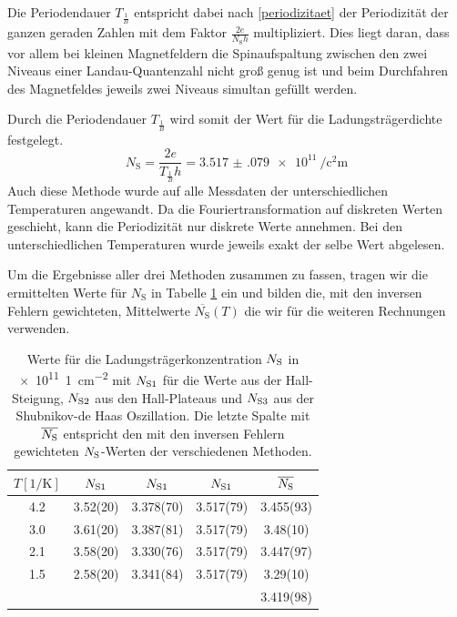 \documentclass[paper=a4,fontsize=10pt,DIV=18,twocolumn,parskip=half]{scrartcl}
\numberwithin{equation}{section}    %
\begin{document}
Die Periodendauer $T_{\frac{1}{B}}$ entspricht dabei nach \eqref{periodizitaet} der Periodizität der ganzen geraden Zahlen mit dem Faktor $\frac{2 e}{N_\mathrm{S} h}$ multipliziert. Dies liegt daran, dass vor allem bei kleinen Magnetfeldern die Spinaufspaltung zwischen den zwei Niveaus einer Landau-Quantenzahl nicht groß genug ist und beim Durchfahren des Magnetfeldes jeweils zwei Niveaus simultan gefüllt werden.

Durch die Periodendauer $T_{\frac{1}{B}}$ wird somit der Wert für die Ladungsträgerdichte festgelegt.
\begin{equation}
N_\mathrm{S}=\frac{2 e}{T_{\frac{1}{B}} h}=\SI{3.517(079)e11}{\per\square\centi\meter}
\label{ns_periode}
\end{equation}
Auch diese Methode wurde auf alle Messdaten der unterschiedlichen Temperaturen angewandt. Da die Fouriertransformation auf diskreten Werten geschieht, kann die Periodizität nur diskrete Werte annehmen. Bei den unterschiedlichen Temperaturen wurde jeweils exakt der selbe Wert abgelesen.

Um die Ergebnisse aller drei Methoden zusammen zu fassen, tragen wir die ermittelten Werte für $N_\mathrm{S}$ in Tabelle \ref{nswerte} ein und bilden die, mit den inversen Fehlern gewichteten, Mittelwerte $\overline{N_\mathrm{S}}(T)$ die wir für die weiteren Rechnungen verwenden.

\begin{table}[htp]
	\begin{center}
		\begin{tabular}{ccccc}
			\hline
			$T[1/\mathrm{K}]$ & $N_{\rm S1}$ & $N_{\rm S1}$ & $N_{\rm S1}$ & $\overline{N_{\rm S}}$\\
			\hline
			4.2 & 3.52(20) & 3.378(70) & 3.517(79) & 3.455(93)\\
			3.0 & 3.61(20) & 3.387(81) & 3.517(79) & 3.48(10)\\
			2.1 & 3.58(20) & 3.330(76) & 3.517(79) & 3.447(97)\\
			1.5 & 2.58(20) & 3.341(84) & 3.517(79) & 3.29(10)\\
			\hline
			\hline
			 &  &  &  &3.419(98)\\
		\end{tabular}
		\caption{Werte für die Ladungsträgerkonzentration $N_{\rm S}$ in \SI[per-mode=symbol]{e11}{1\per\centi\meter\squared} mit $N_{\rm S1}$ für die Werte aus der Hall-Steigung, $N_{\rm S2}$ aus den Hall-Plateaus und $N_{\rm S3}$ aus der Shubnikov-de Haas Oszillation. Die letzte Spalte mit $\overline{N_{\rm S}}$ entspricht den mit den inversen Fehlern gewichteten $N_{\rm S}$-Werten der verschiedenen Methoden.}
		\label{nswerte}
	\end{center}
\end{table}
\end{document}
